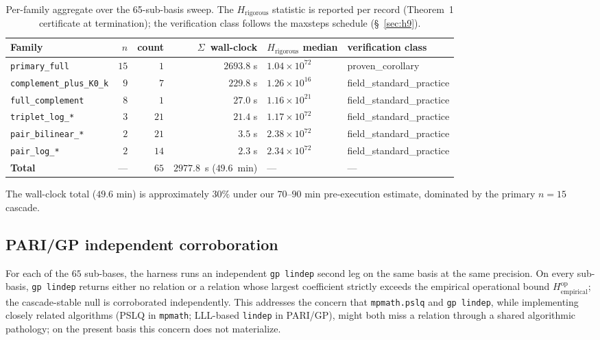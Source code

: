 \documentclass[11pt,a4paper]{article}
\newcommand{\Hrig}{H_{\mathrm{rigorous}}}
\newcommand{\Hempop}{H_{\mathrm{empirical}}^{\mathrm{op}}}
\newcommand{\fsp}{\textsf{field\_standard\_practice}}
\newcommand{\pc}{\textsf{proven\_corollary}}
\begin{document}
\begin{table}[h]
\centering
\caption{Per-family aggregate over the 65-sub-basis sweep.
  The $\Hrig$ statistic is reported per record (Theorem~1 certificate at
  termination); the verification class follows the maxsteps schedule
  (\S~\ref{sec:h9}).\label{tab:family}}
\small
\begin{tabular}{lrrrll}
\toprule
Family & $n$ & count & $\Sigma$~wall-clock & $\Hrig$ median & verification class \\
\midrule
\texttt{primary\_full}             & $15$ & $1$ & $2693.8$ s & $1.04\times 10^{72}$ & \pc{} \\
\texttt{complement\_plus\_K0\_k}    & $9$  & $7$ & $229.8$ s  & $1.26\times 10^{16}$ & \fsp{} \\
\texttt{full\_complement}          & $8$  & $1$ & $27.0$ s   & $1.16\times 10^{21}$ & \fsp{} \\
\texttt{triplet\_log\_*}           & $3$  & $21$ & $21.4$ s & $1.17\times 10^{72}$ & \fsp{} \\
\texttt{pair\_bilinear\_*}         & $2$  & $21$ & $3.5$ s  & $2.38\times 10^{72}$ & \fsp{} \\
\texttt{pair\_log\_*}              & $2$  & $14$ & $2.3$ s  & $2.34\times 10^{72}$ & \fsp{} \\
\midrule
\textbf{Total}                     & ---  & $65$ & $2977.8$~s ($49.6$~min) & --- & --- \\
\bottomrule
\end{tabular}
\end{table}

The wall-clock total ($49.6$ min) is approximately $30\%$ under our
$70$--$90$ min pre-execution estimate, dominated by the primary $n=15$
cascade.

\subsection{PARI/GP independent corroboration}\label{sec:results-gp}

For each of the $65$ sub-bases, the harness runs an independent
\texttt{gp lindep} second leg on the same basis at the same precision.
On every sub-basis, \texttt{gp lindep} returns either no relation or a
relation whose largest coefficient strictly exceeds the empirical operational
bound $\Hempop$; the cascade-stable null is corroborated independently.
This addresses the concern that \texttt{mpmath.pslq} and \texttt{gp lindep},
while implementing closely related algorithms (PSLQ in \texttt{mpmath};
LLL-based \texttt{lindep} in PARI/GP), might both miss a relation
through a shared algorithmic pathology; on the present basis this concern
does not materialize.
\end{document}
